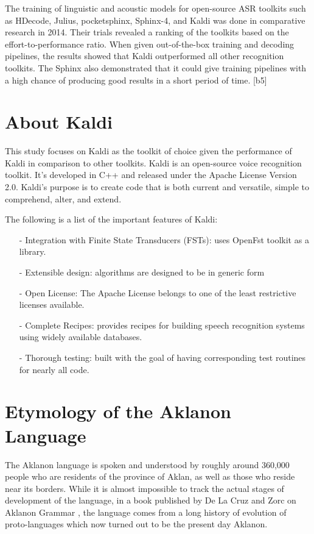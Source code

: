 The training of linguistic and acoustic models for open-source ASR toolkits such as HDecode, Julius, pocketsphinx, Sphinx-4, and Kaldi was done in comparative research in 2014. Their trials revealed a ranking of the toolkits based on the effort-to-performance ratio. When given out-of-the-box training and decoding pipelines, the results showed that Kaldi outperformed all other recognition toolkits. The Sphinx also demonstrated that it could give training pipelines with a high chance of producing good results in a short period of time. [b5]

\section{About Kaldi}


This study focuses on Kaldi as the toolkit of choice given the performance of Kaldi in comparison to other toolkits. Kaldi is an open-source voice recognition toolkit. It's developed in C++ and released under the Apache License Version 2.0. Kaldi's purpose is to create code that is both current and versatile, simple to comprehend, alter, and extend.

\noindent
The following is a list of the important features of Kaldi: 

\begin{itemize}
\item[-] Integration with Finite State Transducers (FSTs): uses OpenFst toolkit as a library.
\item[-] Extensible design: algorithms are designed to be in generic form
\item[-] Open License: The Apache License belongs to one of the least restrictive licenses available. 
\item[-] Complete Recipes: provides recipes for building speech recognition systems using widely available databases.
\item[-] Thorough testing: built with the goal of having corresponding test routines for nearly all code.

\end{itemize}


\section{Etymology of the Aklanon Language}

The Aklanon language is spoken and understood by roughly around 360,000 people who are residents of the province of Aklan, as well as those who reside near its borders. While it is almost impossible to track the actual stages of development of the language, in a book published by De La Cruz and Zorc on Aklanon Grammar \cite{de1968study}, the language comes from a long history of evolution of proto-languages which now turned out to be the present day Aklanon. 

